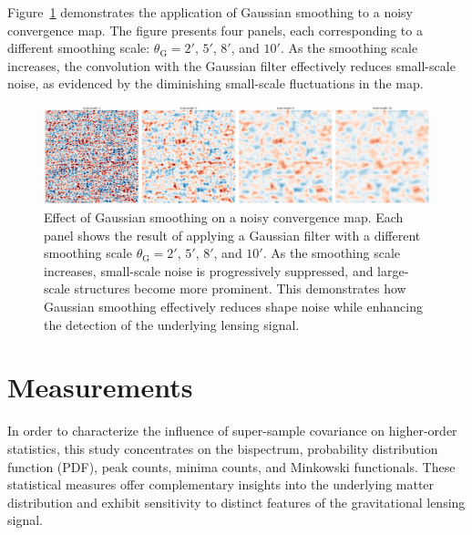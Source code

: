 Figure~\ref{fig:smoothing} demonstrates the application of Gaussian smoothing to a noisy convergence map. The figure presents four panels, each corresponding to a different smoothing scale: $\theta_{\mathrm{G}} = 2'$, $5'$, $8'$, and $10'$. As the smoothing scale increases, the convolution with the Gaussian filter effectively reduces small-scale noise, as evidenced by the diminishing small-scale fluctuations in the map. 
\begin{figure}[ht]
    \centering
    \includegraphics[width=\textwidth]{figures/smoothed_comparison.png}
    \caption{Effect of Gaussian smoothing on a noisy convergence map. Each panel shows the result of applying a Gaussian filter with a different smoothing scale $\theta_{\mathrm{G}} = 2'$, $5'$, $8'$, and $10'$. As the smoothing scale increases, small-scale noise is progressively suppressed, and large-scale structures become more prominent. This demonstrates how Gaussian smoothing effectively reduces shape noise while enhancing the detection of the underlying lensing signal.}
\label{fig:smoothing}
\end{figure}

\section{Measurements}
In order to characterize the influence of super-sample covariance on higher-order statistics, this study concentrates on the bispectrum, probability distribution function (PDF), peak counts, minima counts, and Minkowski functionals. These statistical measures offer complementary insights into the underlying matter distribution and exhibit sensitivity to distinct features of the gravitational lensing signal.

